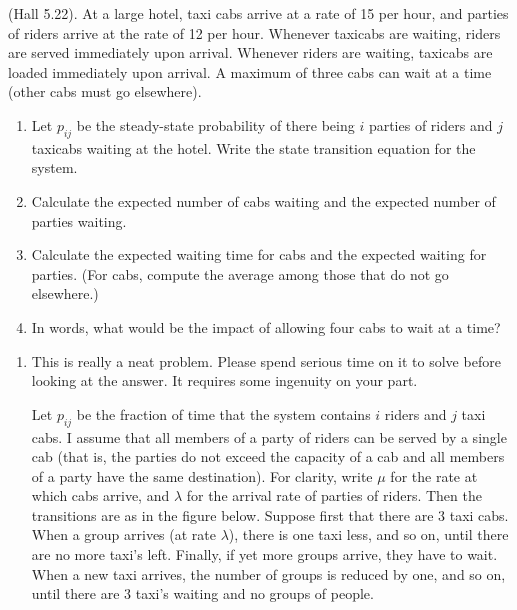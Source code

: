 \begin{question}
  (Hall 5.22). At a large hotel, taxi cabs arrive at a rate of 15 per
  hour, and parties of riders arrive at the rate of 12 per
  hour. Whenever taxicabs are waiting, riders are served immediately
  upon arrival. Whenever riders are waiting, taxicabs are loaded
  immediately upon arrival. A maximum of three cabs can wait at a time (other cabs must go elsewhere).
  \begin{enumerate}
  \item Let $p_{ij}$ be the steady-state probability of there being $i$ parties of riders and $j$ taxicabs waiting at the hotel. Write the state transition equation for the system. 
  \item Calculate the expected number of cabs waiting and the expected number of parties waiting.
  \item Calculate the expected waiting time for cabs and the expected waiting for parties. (For cabs, compute the average among those that do not go elsewhere.)
  \item In words, what would be the impact of allowing four cabs to wait at a time?
  \end{enumerate}
  

    \begin{solution}
      \begin{enumerate}
      \item 
This is really a neat problem. Please spend serious time on it to
solve before looking at the answer. It requires some ingenuity on your part. 

Let $p_{ij}$ be the fraction of time that the system contains $i$
riders and $j$ taxi cabs. I assume that all members of a party of
riders can be served by a single cab (that is, the parties do not
exceed the capacity of a cab and all members of a party have the same
destination). For clarity, write $\mu$ for the rate at which cabs
arrive, and $\lambda$ for the arrival rate of parties of riders.  Then
the transitions are as in the figure below. Suppose first that there
are $3$ taxi cabs. When a group arrives (at rate $\lambda$), there is
one taxi less, and so on, until there are no more taxi's
left. Finally, if yet more groups arrive, they have to wait. When a
new taxi arrives, the number of groups is reduced by one, and so on,
until there are $3$ taxi's waiting and no groups of people.


    \begin{center}


\end{center}
\end{enumerate}
\end{solution}
\end{question}
